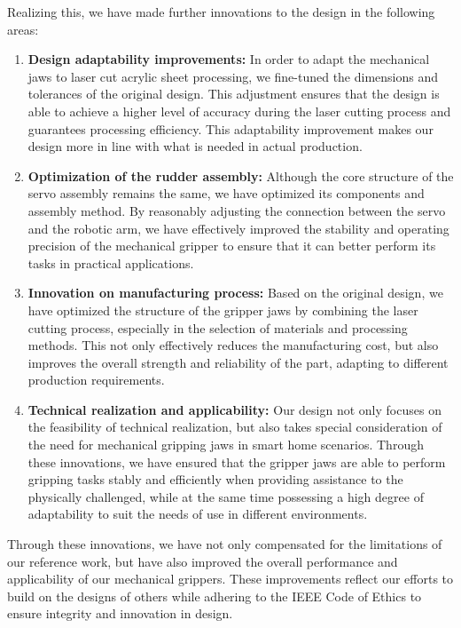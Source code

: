 \documentclass{senior-design}
\begin{document}
Realizing this, we have made further innovations to the design in the following areas: 
\begin{enumerate}
    \item \textbf{Design adaptability improvements:} In order to adapt the mechanical jaws to laser cut acrylic sheet processing, we fine-tuned the dimensions and tolerances of the original design. This adjustment ensures that the design is able to achieve a higher level of accuracy during the laser cutting process and guarantees processing efficiency. This adaptability improvement makes our design more in line with what is needed in actual production. 
    \item \textbf{Optimization of the rudder assembly:} Although the core structure of the servo assembly remains the same, we have optimized its components and assembly method. By reasonably adjusting the connection between the servo and the robotic arm, we have effectively improved the stability and operating precision of the mechanical gripper to ensure that it can better perform its tasks in practical applications. 
    \item \textbf{Innovation on manufacturing process:} Based on the original design, we have optimized the structure of the gripper jaws by combining the laser cutting process, especially in the selection of materials and processing methods. This not only effectively reduces the manufacturing cost, but also improves the overall strength and reliability of the part, adapting to different production requirements. 
    \item \textbf{Technical realization and applicability:} Our design not only focuses on the feasibility of technical realization, but also takes special consideration of the need for mechanical gripping jaws in smart home scenarios. Through these innovations, we have ensured that the gripper jaws are able to perform gripping tasks stably and efficiently when providing assistance to the physically challenged, while at the same time possessing a high degree of adaptability to suit the needs of use in different environments. 
\end{enumerate}
 
Through these innovations, we have not only compensated for the limitations of our reference work, but have also improved the overall performance and applicability of our mechanical grippers. These improvements reflect our efforts to build on the designs of others while adhering to the IEEE Code of Ethics \cite{IEEE} to ensure integrity and innovation in design. 
\end{document}
